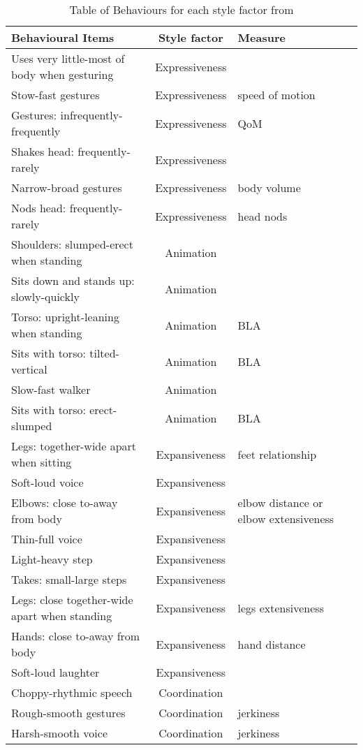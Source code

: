 \begin{table}[h]
	\small
	\centering
	\begin{tabular}{|l |c| l }\hline
		\textbf{Behavioural Items}  &	\textbf{Style factor} & Measure \\ \hline
		Uses very little-most of body when gesturing & Expressiveness  & \\
		Stow-fast gestures  & Expressiveness  & speed of motion\\
		Gestures: infrequently-frequently & Expressiveness & QoM\\
		Shakes head: frequently-rarely & Expressiveness & \\
		Narrow-broad gestures & Expressiveness & body volume\\
		Nods head: frequently-rarely & Expressiveness & head nods\\ \hline
	
		Shoulders: slumped-erect when standing & Animation &\\
		Sits down and stands up: slowly-quickly & Animation &\\
		Torso: upright-leaning when standing & Animation & BLA\\
		Sits with torso: tilted-vertical & Animation & BLA\\
		Slow-fast walker & Animation &\\
		Sits with torso: erect-slumped & Animation & BLA\\ \hline
	
		Legs: together-wide apart when sitting & Expansiveness & feet relationship\\
		Soft-loud voice & Expansiveness & \\
		Elbows: close to-away from body & Expansiveness & elbow distance or elbow extensiveness\\
		Thin-full voice & Expansiveness &\\
		Light-heavy step & Expansiveness &\\
		Takes: small-large steps & Expansiveness & \\
		Legs: close together-wide apart when standing  & Expansiveness & legs extensiveness\\
		Hands: close to-away from body & Expansiveness & hand distance\\ 
		Soft-loud laughter & Expansiveness & \\ \hline
		
		Choppy-rhythmic speech & Coordination&\\
		Rough-smooth gestures & Coordination& jerkiness\\
		Harsh-smooth voice & Coordination& jerkiness\\ 
		\hline
	
	\end{tabular}
	\label{tab:styledims_gallaher}
	\caption{Table of Behaviours for each style factor from \cite{Gallaher1992}}
	
\end{table} 


